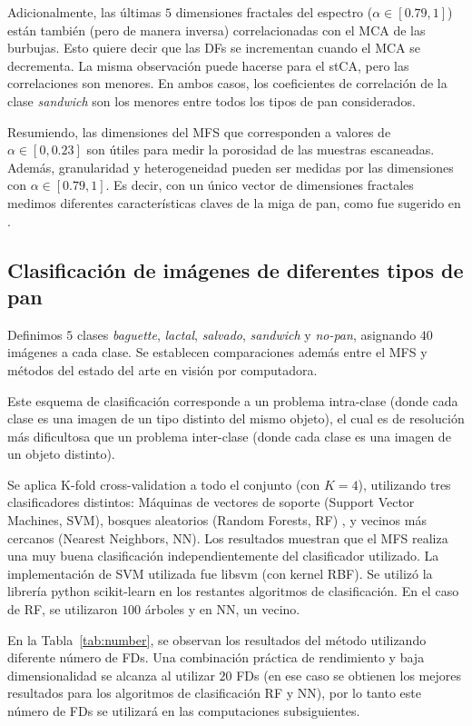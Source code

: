 Adicionalmente, las últimas $5$ dimensiones fractales  del espectro ($\alpha \in [0.79,1]$) están también (pero de manera inversa) correlacionadas con el MCA de las burbujas.
Esto quiere decir que las DFs se incrementan cuando el MCA se decrementa.
La misma observación puede hacerse para el stCA, pero las correlaciones son menores.
En ambos casos, los coeficientes de correlación de la clase {\em sandwich} son los menores entre todos los tipos de pan considerados.

Resumiendo, las dimensiones del MFS que corresponden a valores de  $\alpha \in [0,0.23]$ son útiles para medir la porosidad de las muestras escaneadas. Además, granularidad y heterogeneidad pueden ser medidas por las dimensiones con  $\alpha \in [0.79,1]$. Es decir, con un único vector de dimensiones fractales medimos diferentes características claves de la miga de pan, como fue sugerido en \cite{Gonzales2008}.

\subsection{Clasificaci\'on de imágenes de diferentes tipos de pan}

Definimos $5$ clases {\em baguette}, {\em lactal}, {\em salvado}, {\em sandwich} y {\em no-pan}, asignando $40$ imágenes a cada clase.  Se establecen comparaciones además entre el MFS y métodos del estado del arte en visión por computadora.

Este esquema de clasificación corresponde a un problema intra-clase (donde cada clase es una imagen de un tipo distinto del mismo objeto), el cual es de resolución más dificultosa que un problema inter-clase (donde cada clase es una imagen de un objeto distinto).

Se aplica K-fold cross-validation a todo el conjunto (con $K=4$), utilizando tres clasificadores distintos: Máquinas de vectores de soporte (Support Vector Machines, \acrshort{SVM}),  bosques aleatorios (Random Forests, \acrshort{RF}) \cite{Breiman2001}, y vecinos más cercanos (Nearest Neighbors, \acrshort{NN}).
Los resultados muestran que el MFS realiza una muy buena clasificación independientemente del clasificador utilizado.
La implementación de SVM utilizada fue \textsf{libsvm} \cite{Chang2011} (con kernel RBF).
Se utilizó la librería python \textsf{scikit-learn} en los restantes algoritmos de clasificación.
En el caso de RF, se utilizaron $100$ árboles y en NN, un vecino.

En la Tabla~\ref{tab:number}, se observan los resultados del método utilizando diferente número de FDs.
Una combinación práctica de rendimiento y baja dimensionalidad se alcanza al utilizar $20$ FDs (en ese caso se obtienen los mejores resultados para los algoritmos de clasificación RF y NN), por lo tanto este número de FDs se utilizará en las computaciones subsiguientes.





